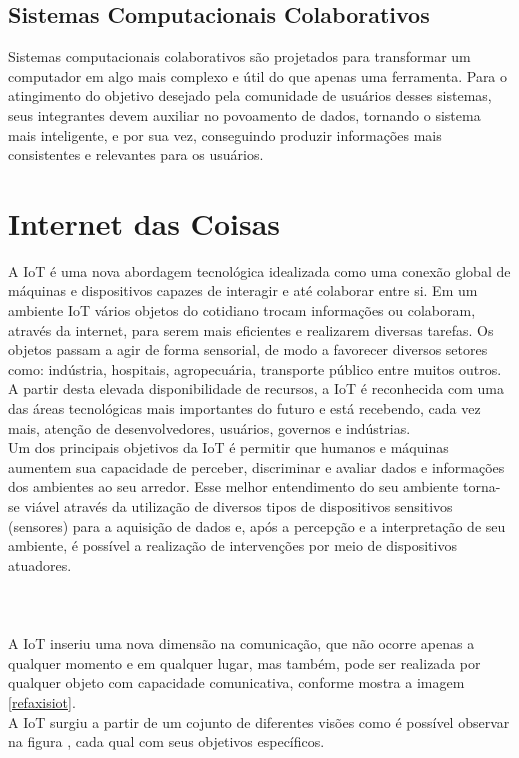 \subsection{Sistemas Computacionais Colaborativos}
\quad Sistemas computacionais colaborativos são projetados para transformar um computador em algo mais complexo e útil do que apenas uma ferramenta.
Para o atingimento do objetivo desejado pela comunidade de usuários desses sistemas, seus integrantes devem auxiliar no povoamento de dados,
tornando o sistema mais inteligente, e por sua vez, conseguindo produzir informações mais consistentes e relevantes para os usuários.

\section{Internet das Coisas}%
\quad
A \acrlong{IoT} é uma nova abordagem tecnológica idealizada como uma conexão global
de máquinas e dispositivos capazes de interagir e até colaborar entre si. Em um ambiente \acrshort{IoT} vários objetos do cotidiano trocam informações
ou colaboram, através da internet, para serem mais eficientes e realizarem diversas tarefas.
Os objetos passam a agir de forma sensorial, de modo a favorecer diversos setores como:
indústria, hospitais, agropecuária, transporte público entre muitos outros. A partir desta
elevada disponibilidade de recursos, a \acrshort{IoT} é reconhecida com uma das áreas tecnológicas mais importantes
do futuro e está recebendo, cada vez mais, atenção de desenvolvedores, usuários, governos e indústrias.
\\ \null
\quad
Um dos principais objetivos da \acrlong{IoT} é permitir
que humanos e máquinas aumentem sua capacidade de perceber, discriminar e avaliar dados e informações dos ambientes ao seu arredor.
 Esse melhor entendimento do seu ambiente torna-se viável através da utilização
 de diversos tipos de dispositivos sensitivos (sensores) para a aquisição de dados e, após a percepção e a interpretação
 de seu ambiente, é possível a realização de intervenções por meio de dispositivos atuadores. \\\\\\\\ \null
 \quad A \acrshort{IoT}
 inseriu uma nova dimensão na comunicação, que não ocorre apenas a qualquer momento e em qualquer lugar, mas também, pode ser realizada por qualquer objeto
 com capacidade comunicativa, conforme mostra a imagem \ref{refaxisiot}.
\\ \null
 \quad
 A \acrlong{IoT} surgiu a partir de um cojunto de diferentes visões como é possível observar na figura , cada qual com seus objetivos específicos. %
 \pagebreak
